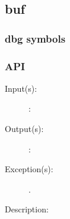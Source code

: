 %
%
%
%
%              

\subsection{buf}
\label{buf}

\subsubsection{dbg symbols}

\subsubsection{API}
\begin{description}
\label{buf_}
\item[{\cfunc[]{buf\_}{}}: ]
	\begin{description}\item[]
	\item[Input(s): ]
		\begin{description}\item[]
		\item[: ]
		\end{description}
	\item[Output(s): ]
		\begin{description}\item[]
		\item[: ]
		\end{description}
	\item[Exception(s): ]
		\begin{description}\item[]
		\item[.]
		\end{description}
	\item[Description: ]
	\end{description}
\end{description}
